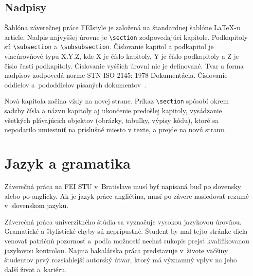 \subsection*{Nadpisy}
Šablóna záverečnej práce FEIstyle je založená na
štandardnej šablóne \LaTeX-u article.
Nadpis najvyššej úrovne je \verb|\section| zodpovedajúci kapitole.
Podkapitoly sú \verb|\subsection| a~\verb|\subsubsection|.
Číslovanie kapitol a podkapitol je viacúrovňové typu X.Y.Z, kde X je číslo kapitoly, Y je číslo podkapitoly a Z je číslo časti podkapitoly.
Číslovanie vyšších úrovní nie je definované.
Tvar a forma nadpisov zodpovedá norme STN ISO 2145: 1978 Dokumentácia.
Číslovanie oddielov a~pododdielov písaných dokumentov~\cite{iso2145}.

Nová kapitola začína vždy na novej strane.
Príkaz \verb|\section| spôsobí okrem sadzby čísla a názvu kapitoly aj ukončenie predošlej kapitoly, vysádzanie všetkých plávajúcich objektov (obrázky, tabuľky, výpisy kódu), ktoré sa nepodarilo umiestniť na príslušné miesto v texte, a prejde na novú stranu.

\section{Jazyk a gramatika}
Záverečná práca na FEI STU v~Bratislave musí byť napísaná
buď po slovensky alebo po anglicky.
Ak je jazyk práce angličtina, musí po závere nasledovať
rezumé v~slovenskom jazyku.

Záverečná práca univerzitného štúdia sa vyznačuje
vysokou jazykovou úrovňou.
Gramatické a štylistické chyby sú neprípustné.
Študent by mal tejto stránke diela venovať patričnú
pozornosť a~podľa možností nechať rukopis prejsť
kvalifikovanou jazykovou kontrolou.
Najmä bakalárska práca predstavuje v~živote väčšiny študentov
prvý rozsiahlejší autorský útvar,
ktorý má významný vplyv na jeho ďalší život a~kariéru.

